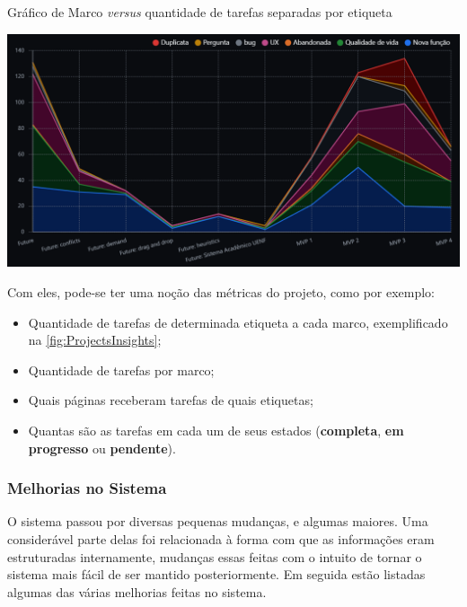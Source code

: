 \begin{MyCenteredFigure} \caption{Gráfico de Marco \textit{versus} quantidade de tarefas separadas por etiqueta} \label{fig:ProjectsInsights}
  \includegraphics[width=\textwidth]{files/img/2.02!5-desenvolvimento/2.02!5.1.4-sistema/GitHubProjects-Insights-Stacked_Line-Milestone_Label}
\end{MyCenteredFigure}

Com eles, pode-se ter uma noção das métricas do projeto, como por exemplo:

\begin{itemize}
  \item Quantidade de tarefas de determinada etiqueta a cada marco, exemplificado na \autoref{fig:ProjectsInsights};
  \item Quantidade de tarefas por marco;
  \item Quais páginas receberam tarefas de quais etiquetas;
  \item Quantas são as tarefas em cada um de seus estados (\textbf{completa}, \textbf{em progresso} ou \textbf{pendente}).
\end{itemize}

\subsubsection{Melhorias no Sistema} \label{sssec:Melhorias no Sistema}

O sistema passou por diversas pequenas mudanças, e algumas maiores. Uma considerável parte delas foi relacionada à forma com que as informações eram estruturadas internamente, mudanças essas feitas com o intuito de tornar o sistema mais fácil de ser mantido posteriormente. Em seguida estão listadas algumas das várias melhorias feitas no sistema.

 \label{ssssec:Filtros e ordenações}

